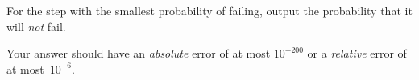 
    For the step with the smallest probability of failing,
    output the probability that it will \emph{not} fail.

    Your answer should have an \emph{absolute} error of at most $10^{-200}$
    or a \emph{relative} error of at most~$10^{-6}$.

